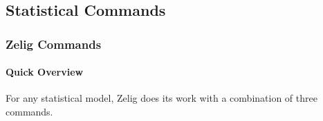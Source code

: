 \documentclass[letterpaper,10pt,english]{sphinxmanual}
\begin{document}
\subsection{Statistical Commands}
\label{docs/user_guide:statistical-commands}\label{docs/user_guide:userguide-statistical-commands}

\subsubsection{Zelig Commands}
\label{docs/user_guide:zelig-commands}

\paragraph{Quick Overview}
\label{docs/user_guide:quick-overview}
For any statistical model, Zelig does its work with a combination of
three commands.
\end{document}
